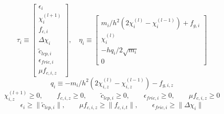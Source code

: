 \documentclass[a4paper,10pt]{article}
\begin{document}
\begin{equation}
\tau_i \equiv
\left[\begin{array}{c}
\epsilon_i \\ \chi^{(l+1)}_i \\ f_{c,i} \\ \Delta\chi_i \\ \tilde{c}_{lcp,i} \\ \epsilon_{fric,i} \\ \mu f_{c,i,z}
\end{array}\right], \quad
\eta_i \equiv
\left[\begin{array}{c}
m_i/h^2(2\chi^{(l)}_i-\chi^{(l-1)}_i) + f_{g,i} \\
\chi^{(l)}_i \\
-hq_i/2\sqrt{m_i} \\
0
\end{array}\right]
\end{equation}
\begin{equation}
q_i \equiv -m_i/h^2(2\chi^{(l)}_{i,z}-\chi^{(l-1)}_{i,z})-f_{g,i,z}
\end{equation}
\begin{equation}
\chi^{(l+1)}_{i,z} \geq 0       , \quad\quad
f_{c,i,z} \geq 0              , \quad\quad
\tilde{c}_{lcp,i} \geq 0          , \quad\quad
\epsilon_{fric,i} \geq 0          , \quad\quad
\mu f_{c,i,z} \geq 0
\end{equation}
\begin{equation}
\epsilon_i            \geq \| \tilde{c}_{lcp,i} \| , \quad\quad
\mu f_{c,i,z}  \geq \| f_{c,i,t}         \| , \quad\quad
\epsilon_{fric,i}    \geq \| \Delta\chi_i      \| 
\end{equation}
\end{document}
